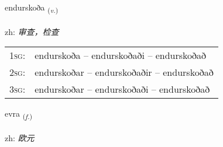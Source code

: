 \documentclass[frontgrid, backgrid]{flacards}\usepackage[]{graphicx}\usepackage[]{color}
\begin{document}
\renewcommand{\blhead}{\vskip5pt {\small\bfseries\footnotesize Sagnorð | 动词 }}
\renewcommand{\bcfoot}{\vskip5pt \hspace{2pt}{\small\bfseries\footnotesize 2K}}


{endurskoða \small{\textsubscript{(\textit{v.})}} \\[1ex] %
 \\
zh: \emph{审查，检查} \\  [2ex]
\renewcommand*{\arraystretch}{0.8}
\begin{tabular}{p{1cm}l}
\textsc{1sg}: & endurskoða -- endurskoðaði -- endurskoðað \\ 
\textsc{2sg}: & endurskoðar -- endurskoðaðir -- endurskoðað \\ 
\textsc{3sg}: & endurskoðar -- endurskoðaði -- endurskoðað \\ 
\end{tabular}
}

\renewcommand{\flhead}{\vskip5pt \fboxsep=0pt {\small\bfseries\footnotesize Nafnorð | 名词}}
\renewcommand{\fcfoot}{\vskip5pt \fboxsep=0pt \hspace{2pt}{\small\bfseries\footnotesize 2K}}

\renewcommand{\blhead}{\vskip5pt {\small\bfseries\footnotesize Nafnorð | 名词 }}
\renewcommand{\bcfoot}{\vskip5pt \hspace{2pt}{\small\bfseries\footnotesize 2K}}


{evra \small{\textsubscript{(\textit{f.})}} \\[1ex] %
\textphonetic{[ɛvra]} \\
zh: \emph{欧元} \\  [2ex]
\renewcommand*{\arraystretch}{0.8}
}
\end{document}
